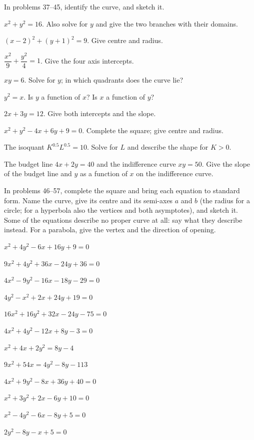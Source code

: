In problems 37--45, identify the curve, and sketch it.

\begin{problems}[resume]
  \item $x^{2}+y^{2}=16$. Also solve for $y$ and give the two branches with
        their domains.
  \item $(x-2)^{2}+(y+1)^{2}=9$. Give centre and radius.
  \item $\dfrac{x^{2}}{9}+\dfrac{y^{2}}{4}=1$. Give the four axis
        intercepts.
  \item $xy=6$. Solve for $y$; in which quadrants does the curve lie?
  \item $y^{2}=x$. Is $y$ a function of $x$? Is $x$ a function of $y$?
  \item $2x+3y=12$. Give both intercepts and the slope.
  \item $x^{2}+y^{2}-4x+6y+9=0$. Complete the square; give centre and
        radius.
  \item The isoquant $K^{0.5}L^{0.5}=10$. Solve for $L$ and describe the
        shape for $K>0$.
  \item The budget line $4x+2y=40$ and the indifference curve $xy=50$.
        Give the slope of the budget line and $y$ as a function of $x$ on
        the indifference curve.
\end{problems}

In problems 46--57, complete the square and bring each equation to
standard form. Name the curve, give its centre and its semi-axes $a$ and
$b$ (the radius for a circle; for a hyperbola also the vertices and both
asymptotes), and sketch it. Some of the equations describe no proper
curve at all: say what they describe instead. For a parabola, give the
vertex and the direction of opening.

\begin{problems}[resume]
  \item $x^{2}+4y^{2}-6x+16y+9=0$
  \item $9x^{2}+4y^{2}+36x-24y+36=0$
  \item $4x^{2}-9y^{2}-16x-18y-29=0$
  \item $4y^{2}-x^{2}+2x+24y+19=0$
  \item $16x^{2}+16y^{2}+32x-24y-75=0$
  \item $4x^{2}+4y^{2}-12x+8y-3=0$
  \item $x^{2}+4x+2y^{2}=8y-4$
  \item $9x^{2}+54x=4y^{2}-8y-113$
  \item $4x^{2}+9y^{2}-8x+36y+40=0$
  \item $x^{2}+3y^{2}+2x-6y+10=0$
  \item $x^{2}-4y^{2}-6x-8y+5=0$
  \item $2y^{2}-8y-x+5=0$
\end{problems}

